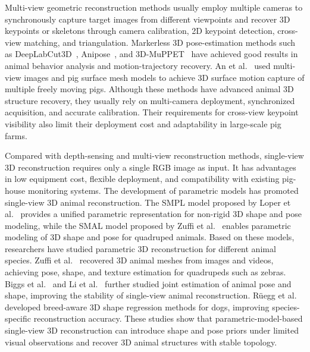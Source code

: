 \documentclass[runningheads]{llncs}
\begin{document}
Multi-view geometric reconstruction methods usually employ multiple cameras to synchronously capture target images from different viewpoints and recover 3D keypoints or skeletons through camera calibration, 2D keypoint detection, cross-view matching, and triangulation. Markerless 3D pose-estimation methods such as DeepLabCut3D~\cite{ref15}, Anipose~\cite{ref16}, and 3D-MuPPET~\cite{ref17} have achieved good results in animal behavior analysis and motion-trajectory recovery. An et al.~\cite{ref18} used multi-view images and pig surface mesh models to achieve 3D surface motion capture of multiple freely moving pigs. Although these methods have advanced animal 3D structure recovery, they usually rely on multi-camera deployment, synchronized acquisition, and accurate calibration. Their requirements for cross-view keypoint visibility also limit their deployment cost and adaptability in large-scale pig farms.

Compared with depth-sensing and multi-view reconstruction methods, single-view 3D reconstruction requires only a single RGB image as input. It has advantages in low equipment cost, flexible deployment, and compatibility with existing pig-house monitoring systems. The development of parametric models has promoted single-view 3D animal reconstruction. The SMPL model proposed by Loper et al.~\cite{ref19} provides a unified parametric representation for non-rigid 3D shape and pose modeling, while the SMAL model proposed by Zuffi et al.~\cite{ref20} enables parametric modeling of 3D shape and pose for quadruped animals. Based on these models, researchers have studied parametric 3D reconstruction for different animal species. Zuffi et al.~\cite{ref21,ref22} recovered 3D animal meshes from images and videos, achieving pose, shape, and texture estimation for quadrupeds such as zebras. Biggs et al.~\cite{ref23} and Li et al.~\cite{ref24} further studied joint estimation of animal pose and shape, improving the stability of single-view animal reconstruction. Rüegg et al.~\cite{ref25,ref26} developed breed-aware 3D shape regression methods for dogs, improving species-specific reconstruction accuracy. These studies show that parametric-model-based single-view 3D reconstruction can introduce shape and pose priors under limited visual observations and recover 3D animal structures with stable topology.
\end{document}
